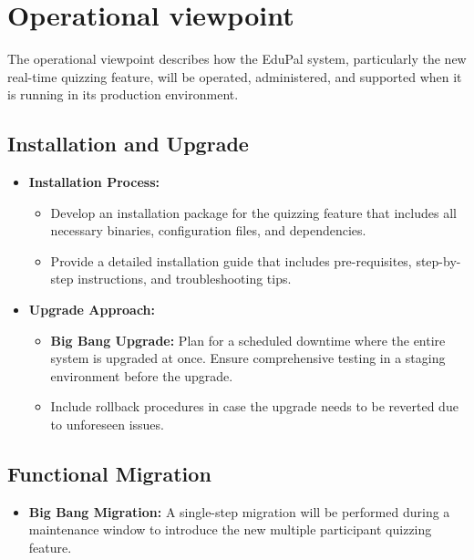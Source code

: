 \section{Operational viewpoint}

The operational viewpoint describes how the EduPal system, particularly the new real-time quizzing feature, will be operated, administered, and supported when it is running in its production environment.


\subsection{Installation and Upgrade}

\begin{itemize}
    \item \textbf{Installation Process:}
          \begin{itemize}
              \item Develop an installation package for the quizzing feature that includes all necessary binaries, configuration files, and dependencies.
              \item Provide a detailed installation guide that includes pre-requisites, step-by-step instructions, and troubleshooting tips.
          \end{itemize}
    \item \textbf{Upgrade Approach:}
          \begin{itemize}
              \item \textbf{Big Bang Upgrade:} Plan for a scheduled downtime where the entire system is upgraded at once. Ensure comprehensive testing in a staging environment before the upgrade.
              \item Include rollback procedures in case the upgrade needs to be reverted due to unforeseen issues.
          \end{itemize}
\end{itemize}


\subsection{Functional Migration}

\begin{itemize}
    \item \textbf{Big Bang Migration:} A single-step migration will be performed during a maintenance window to introduce the new multiple participant quizzing feature.
\end{itemize}


